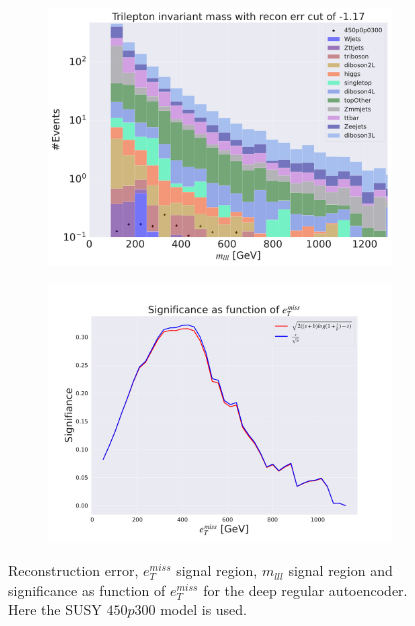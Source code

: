 \begin{figure}[H]
\begin{subfigure}{.49\textwidth}
        \caption{}
        \label{fig:AE_3lep_big_etmiss_450_2}
    \end{subfigure}
    \hfill
    \begin{subfigure}{.49\textwidth}
        \includegraphics[width=\textwidth]{Figures/AE_testing/big/3lep/b_data_recon_big_rm3_feats_sig_450p0p0300_mlll_recon_errcut_-1.17.pdf}
        \caption{}
        \label{fig:AE_3lep_big_mlll_450_2}
    \end{subfigure}
    \hfill   
    \begin{subfigure}{.49\textwidth}
        \includegraphics[width=\textwidth]{Figures/AE_testing/big/3lep/significance_etmiss_450p0p0300_-1.1736206563802147.pdf}
        \caption{}
        \label{fig:AE_3lep_big_signi_450_2}
    \end{subfigure}
    \hfill      
    \caption[3lep deep network | $450p300$ | AE | 2]{Reconstruction error, $e_T^{miss}$ signal region, $m_{lll}$ signal region and significance as function of 
    $e_T^{miss}$ for the deep regular autoencoder. Here the SUSY $450p300$ model is used.}
    \label{fig:AE_3lep_big_rec_sig_signi_450_2}
\end{figure}

